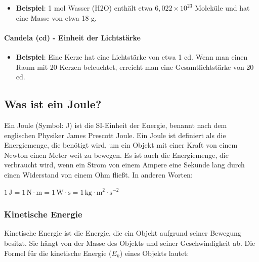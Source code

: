 \documentclass{vorlage-design-main}
\begin{document}
\begin{itemize}

\item
  \textbf{Beispiel}: 1 mol Wasser (H2O) enthält etwa
  $6,022 \times 10^{23}$ Moleküle und hat eine Masse von etwa 18 g.
\end{itemize}

\hypertarget{candela-cd---einheit-der-lichtstuxe4rke}{%
\paragraph{Candela (cd) - Einheit der
Lichtstärke}\label{candela-cd---einheit-der-lichtstaerke}}

\begin{itemize}

\item
  \textbf{Beispiel}: Eine Kerze hat eine Lichtstärke von etwa 1 cd. Wenn
  man einen Raum mit 20 Kerzen beleuchtet, erreicht man eine
  Gesamtlichtstärke von 20 cd.
\end{itemize}

\hypertarget{was-ist-ein-joule}{%
\subsection{Was ist ein Joule?}\label{was-ist-ein-joule}}

Ein Joule (Symbol: J) ist die SI-Einheit der Energie, benannt nach dem
englischen Physiker James Prescott Joule. Ein Joule ist definiert als
die Energiemenge, die benötigt wird, um ein Objekt mit einer Kraft von
einem Newton einen Meter weit zu bewegen. Es ist auch die Energiemenge,
die verbraucht wird, wenn ein Strom von einem Ampere eine Sekunde lang
durch einen Widerstand von einem Ohm fließt. In anderen Worten:

$1 \, \text{J} = 1 \, \text{N} \cdot \text{m} = 1 \, \text{W} \cdot \text{s} = 1 \, \text{kg} \cdot \text{m}^2 \cdot \text{s}^{-2}$

\hypertarget{kinetische-energie}{%
\subsubsection{Kinetische Energie}\label{kinetische-energie}}

Kinetische Energie ist die Energie, die ein Objekt aufgrund seiner
Bewegung besitzt. Sie hängt von der Masse des Objekts und seiner
Geschwindigkeit ab. Die Formel für die kinetische Energie ($E_k$)
eines Objekts lautet:
\end{document}
